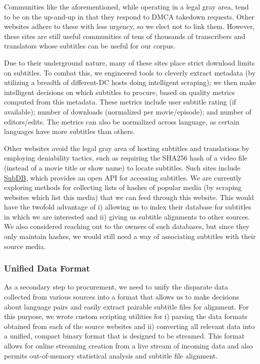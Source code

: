 \documentclass[twoside,twocolumn]{article}
\begin{document}
Communities like the aforementioned, while operating in a legal gray area, tend
to be on the up-and-up in that they respond to DMCA takedown requests. Other
websites adhere to these with less urgency, so we elect not to link them.
However, these sites are still useful communities of tens of thousands of
transcribers and translators whose subtitles can be useful for our corpus.

Due to their underground nature, many of these sites place strict download
limits on subtitles. To combat this, we engineered tools to cleverly extract metadata (by utilizing a breadth of different-DC hosts doing intelligent
scraping); we then make intelligent decisions on which subtitles to procure,
based on quality metrics computed from this metadata. These metrics include user subtitle rating (if available); number of downloads (normalized per
movie/episode); and number of editors/edits. The metrics can also be normalized across language, as certain languages have more subtitles than others.

Other websites avoid the legal gray area of hosting subtitles and translations
by employing deniability tactics, such as requiring the SHA256 hash of a video
file (instead of a movie title or show name) to locate subtitles. Such sites
include \href{http://thesubdb.com/}{SubDB}, which provides an open API for
accessing subtitles. We are currently exploring methods for collecting lists of
hashes of popular media (by scraping websites which list this media) that we
can feed through this website. This would have the twofold advantage of
i) allowing us to index their database for subtitles in which we are interested
and ii) giving us subtitle alignments to other sources. We also considered
reaching out to the owners of such databases, but since they only maintain
hashes, we would still need a way of associating subtitles with their source
media.


\subsubsection{Unified Data Format}

As a secondary step to procurement, we need to unify the disparate data
collected from various sources into a format that allows us to make decisions
about language pairs and easily extract pairable subtitle files for alignment.
For this purpose, we wrote custom scripting utilities for i) parsing
the data formats obtained from each of the source websites and ii) converting
all relevant data into a unified, compact binary format that is designed to be
streamed. This format allows for online streaming creation from a live stream
of incoming data and also permits out-of-memory statistical analysis and
subtitle file alignment.
\end{document}
